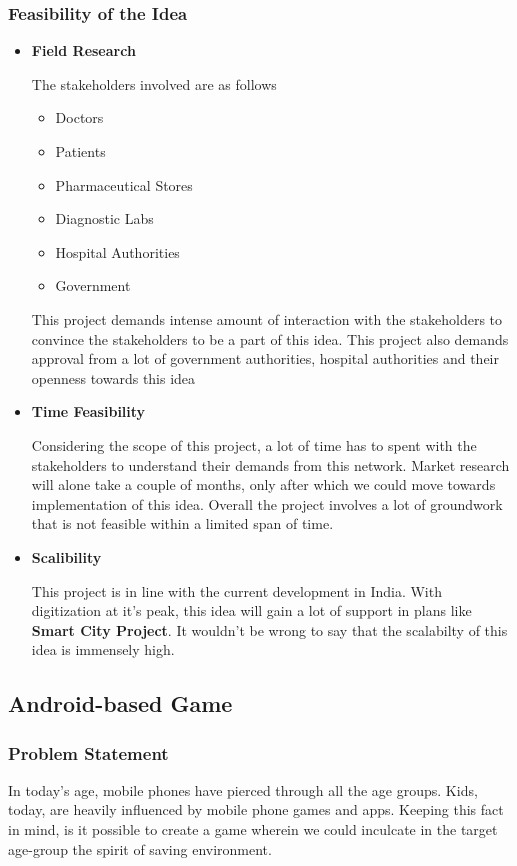 \documentclass{article}
\begin{document}
\subsubsection{Feasibility of the Idea}
\begin{itemize}
\item \textbf{Field Research}
\par The stakeholders involved are as follows
\begin{itemize}
    \item Doctors
    \item Patients
    \item Pharmaceutical Stores
    \item Diagnostic Labs
    \item Hospital Authorities
    \item Government
\end{itemize}
This project demands intense amount of interaction with the stakeholders to convince the stakeholders to be a part of this idea. This project also demands approval from a lot of government authorities, hospital authorities and their openness towards this idea

\item \textbf{Time Feasibility}
\par Considering the scope of this project, a lot of time has to spent with the stakeholders to understand their demands from this network. Market research will alone take a couple of months, only after which we could move towards implementation of this idea. Overall the project involves a lot of groundwork that is not feasible within a limited span of time.
\item \textbf{Scalibility}
\par This project is in line with the current development in India. With digitization at it's peak, this idea will gain a lot of support in plans like \textbf{Smart City Project}. It wouldn't be wrong to say that the scalabilty of this idea is immensely high.
\end{itemize}


\subsection{Android-based Game}
\subsubsection{Problem Statement}
\par In today's age, mobile phones have pierced through all the age groups. Kids, today, are heavily influenced by mobile phone games and apps. Keeping this fact in mind, is it possible to create a game wherein we could inculcate in the target age-group the spirit of saving environment. 
\end{document}
